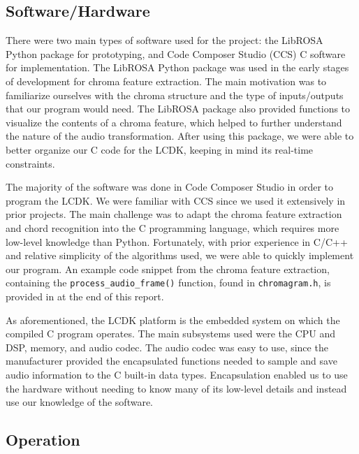 \documentclass[journal]{IEEEtran}
\begin{document}
\subsection{Software/Hardware}
There were two main types of software used for the project: the LibROSA Python package for prototyping, and Code Composer Studio (CCS) C software for implementation.
The LibROSA Python package was used in the early stages of development for chroma feature extraction.
The main motivation was to familiarize ourselves with the chroma structure and the type of inputs/outputs that our program would need.
The LibROSA package also provided functions to visualize the contents of a chroma feature, which helped to further understand the nature of the audio transformation.
After using this package, we were able to better organize our C code for the LCDK, keeping in mind its real-time constraints.

The majority of the software was done in Code Composer Studio in order to program the LCDK.
We were familiar with CCS since we used it extensively in prior projects.
The main challenge was to adapt the chroma feature extraction and chord recognition into the C programming language, which requires more low-level knowledge than Python.
Fortunately, with prior experience in C/C++ and relative simplicity of the algorithms used, we were able to quickly implement our program.
An example code snippet from the chroma feature extraction, containing the \texttt{process\_audio\_frame()} function, found in \texttt{chromagram.h}, is provided in  at the end of this report.

As aforementioned, the LCDK platform is the embedded system on which the compiled C program operates.
The main subsystems used were the CPU and DSP, memory, and audio codec.
The audio codec was easy to use, since the manufacturer provided the encapsulated functions needed to sample and save audio information to the C built-in data types.
Encapsulation enabled us to use the hardware without needing to know many of its low-level details and instead use our knowledge of the software.


\subsection{Operation}
\end{document}
